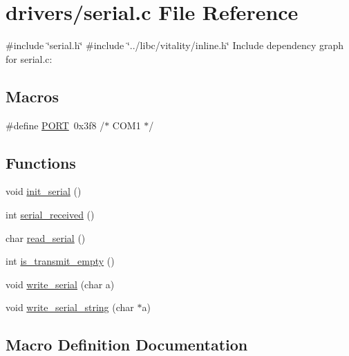 \hypertarget{a00056}{}\section{drivers/serial.c File Reference}
\label{a00056}
{\ttfamily \#include \char`\"{}serial.\+h\char`\"{}}\newline
{\ttfamily \#include \char`\"{}../libc/vitality/inline.\+h\char`\"{}}\newline
Include dependency graph for serial.\+c\+:
\subsection*{Macros}
\begin{DoxyCompactItemize}
\item 
\#define \hyperlink{a00056_a614217d263be1fb1a5f76e2ff7be19a2_a614217d263be1fb1a5f76e2ff7be19a2}{P\+O\+RT}~0x3f8   /$\ast$ C\+O\+M1 $\ast$/
\end{DoxyCompactItemize}
\subsection*{Functions}
\begin{DoxyCompactItemize}
\item 
void \hyperlink{a00056_acfb6f6d615183fc2f71e79dfbadfe27d_acfb6f6d615183fc2f71e79dfbadfe27d}{init\+\_\+serial} ()
\item 
int \hyperlink{a00056_af10f0e64ba89e8635aa7245ca08297c5_af10f0e64ba89e8635aa7245ca08297c5}{serial\+\_\+received} ()
\item 
char \hyperlink{a00056_ad343a7018f74662f794968dfa0523841_ad343a7018f74662f794968dfa0523841}{read\+\_\+serial} ()
\item 
int \hyperlink{a00056_a01fe5504f7b8f4eee1545737495bae76_a01fe5504f7b8f4eee1545737495bae76}{is\+\_\+transmit\+\_\+empty} ()
\item 
void \hyperlink{a00056_aac3c84e21fffc4696d8969ca6955bfc8_aac3c84e21fffc4696d8969ca6955bfc8}{write\+\_\+serial} (char a)
\item 
void \hyperlink{a00056_aabbe45d6670f606c53ba38a5fb14b650_aabbe45d6670f606c53ba38a5fb14b650}{write\+\_\+serial\+\_\+string} (char $\ast$a)
\end{DoxyCompactItemize}


\subsection{Macro Definition Documentation}
\mbox{\label{a00056_a614217d263be1fb1a5f76e2ff7be19a2_a614217d263be1fb1a5f76e2ff7be19a2}} 
